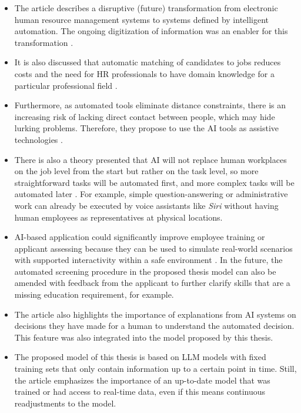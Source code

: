 \documentclass[draft,final]{thesisclass} %
\begin{document}
\begin{itemize}
    \item The article describes a disruptive (future) transformation from electronic human resource management systems to systems defined by intelligent automation. The ongoing digitization of information was an enabler for this transformation \cite[4]{ai_hrm_review}.
    \item It is also discussed that automatic matching of candidates to jobs reduces costs and the need for \acs{HR} professionals to have domain knowledge for a particular professional field \cite[10]{ai_hrm_review}.
    \item Furthermore, as automated tools eliminate distance constraints, there is an increasing risk of lacking direct contact between people, which may hide lurking problems. Therefore, they propose to use the \acs{AI} tools as assistive technologies \cite[12]{ai_hrm_review}.
    \item There is also a theory presented that \acs{AI} will not replace human workplaces on the job level from the start but rather on the task level, so more straightforward tasks will be automated first, and more complex tasks will be automated later \cite[12]{ai_hrm_review}. For example, simple question-answering or administrative work can already be executed by voice assistants like \textit{Siri} without having human employees as representatives at physical locations.
    \item \acs{AI}-based application could significantly improve employee training or applicant assessing because they can be used to simulate real-world scenarios with supported interactivity within a safe environment \cite[13]{ai_hrm_review}. In the future, the automated screening procedure in the proposed thesis model can also be amended with feedback from the applicant to further clarify skills that are a missing education requirement, for example.
    \item The article \parencite[14]{ai_hrm_review} also highlights the importance of explanations from \acs{AI} systems on decisions they have made for a human to understand the automated decision. This feature was also integrated into the model proposed by this thesis.
    \item The proposed model of this thesis is based on \acs{LLM} models with fixed training sets that only contain information up to a certain point in time. Still, the article \textcite[13]{ai_hrm_review} emphasizes the importance of an up-to-date model that was trained or had access to real-time data, even if this means continuous readjustments to the model.
\end{itemize}
\end{document}
